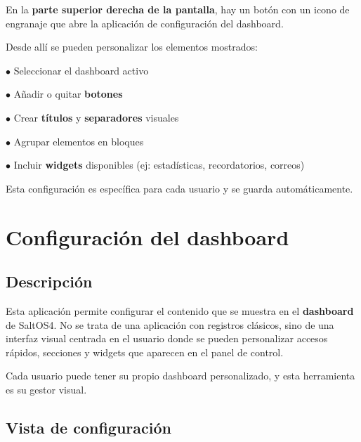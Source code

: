 \documentclass[a4paper]{article}
\begin{document}
En la \textbf{parte superior derecha de la pantalla}, hay un botón con un icono de engranaje que abre la aplicación de configuración del dashboard.

Desde allí se pueden personalizar los elementos mostrados:

\begin{compactitem}
\item[\color{myblue}$\bullet$] Seleccionar el dashboard activo
\item[\color{myblue}$\bullet$] Añadir o quitar \textbf{botones}
\item[\color{myblue}$\bullet$] Crear \textbf{títulos} y \textbf{separadores} visuales
\item[\color{myblue}$\bullet$] Agrupar elementos en bloques
\item[\color{myblue}$\bullet$] Incluir \textbf{widgets} disponibles (ej: estadísticas, recordatorios, correos)
\end{compactitem}

Esta configuración es específica para cada usuario y se guarda automáticamente.


\hypertarget{toc85}{}
\section{Configuración del dashboard}

\hypertarget{toc86}{}
\subsection{Descripción}

Esta aplicación permite configurar el contenido que se muestra en el \textbf{dashboard} de SaltOS4.
No se trata de una aplicación con registros clásicos, sino de una interfaz visual centrada en el usuario donde se pueden personalizar accesos rápidos, secciones y widgets que aparecen en el panel de control.

Cada usuario puede tener su propio dashboard personalizado, y esta herramienta es su gestor visual.

\hypertarget{toc87}{}
\subsection{Vista de configuración}
\end{document}
